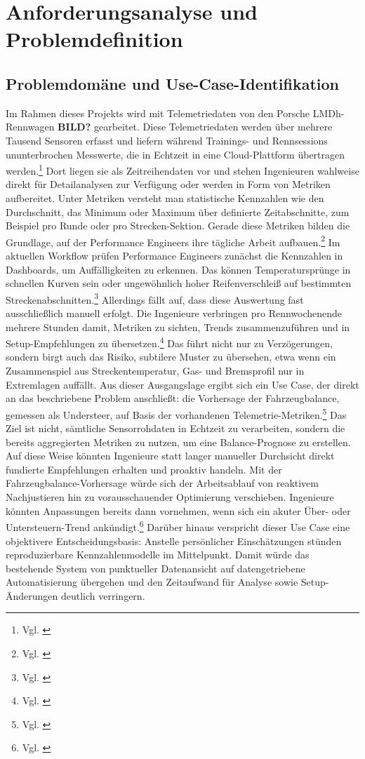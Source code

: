 \chapter{Anforderungsanalyse und Problemdefinition}
\section{Problemdomäne und Use-Case-Identifikation}

Im Rahmen dieses Projekts wird mit Telemetriedaten von den Porsche LMDh-Rennwagen \textbf{BILD?} gearbeitet. Diese Telemetriedaten werden über mehrere Tausend Sensoren erfasst und liefern während Trainings- und Rennsessions ununterbrochen Messwerte, die in Echtzeit in eine Cloud-Plattform übertragen werden.\footnote{Vgl. \cite{Experteninterview1}} Dort liegen sie als Zeitreihendaten vor und stehen Ingenieuren wahlweise direkt für Detailanalysen zur Verfügung oder werden in Form von Metriken aufbereitet. Unter Metriken versteht man statistische Kennzahlen wie den Durchschnitt, das Minimum oder Maximum über definierte Zeitabschnitte, zum Beispiel pro Runde oder pro Strecken-Sektion. Gerade diese Metriken bilden die Grundlage, auf der Performance Engineers ihre tägliche Arbeit aufbauen.\footnote{Vgl. \cite{Experteninterview2}}
Im aktuellen Workflow prüfen Performance Engineers zunächst die Kennzahlen in Dashboards, um Auffälligkeiten zu erkennen. Das können Temperatursprünge in schnellen Kurven sein oder ungewöhnlich hoher Reifenverschleiß auf bestimmten Streckenabschnitten.\footnote{Vgl. \cite{Experteninterview1}} Allerdings fällt auf, dass diese Auswertung fast ausschließlich manuell erfolgt. Die Ingenieure verbringen pro Rennwochenende mehrere Stunden damit, Metriken zu sichten, Trends zusammenzuführen und in Setup-Empfehlungen zu übersetzen.\footnote{Vgl. \cite{Experteninterview1}} Das führt nicht nur zu Verzögerungen, sondern birgt auch das Risiko, subtilere Muster zu übersehen, etwa wenn ein Zusammenspiel aus Streckentemperatur, Gas- und Bremsprofil nur in Extremlagen auffällt.
Aus dieser Ausgangslage ergibt sich ein Use Case, der direkt an das beschriebene Problem anschließt: die Vorhersage der Fahrzeugbalance, gemessen als Understeer, auf Basis der vorhandenen Telemetrie-Metriken.\footnote{Vgl. \cite{Experteninterview2}} Das Ziel ist nicht, sämtliche Sensorrohdaten in Echtzeit zu verarbeiten, sondern die bereits aggregierten Metriken zu nutzen, um eine Balance-Prognose zu erstellen. Auf diese Weise könnten Ingenieure statt langer manueller Durchsicht direkt fundierte Empfehlungen erhalten und proaktiv handeln.
Mit der Fahrzeugbalance-Vorhersage würde sich der Arbeitsablauf von reaktivem Nachjustieren hin zu vorausschauender Optimierung verschieben. Ingenieure könnten Anpassungen bereits dann vornehmen, wenn sich ein akuter Über- oder Untersteuern-Trend ankündigt.\footnote{Vgl. \cite{Experteninterview2}} Darüber hinaus verspricht dieser Use Case eine objektivere Entscheidungsbasis: Anstelle persönlicher Einschätzungen stünden reproduzierbare Kennzahlenmodelle im Mittelpunkt. Damit würde das bestehende System von punktueller Datenansicht auf datengetriebene Automatisierung übergehen und den Zeitaufwand für Analyse sowie Setup-Änderungen deutlich verringern.

